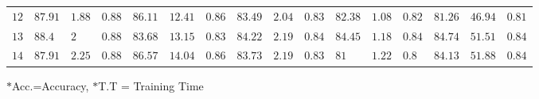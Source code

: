 \begin{table}
{\begin{tabular}{clllllllllllllll}
			$12$                               & $87.91$     & $1.88$      & $0.88$ & $86.11$      & $12.41$      & $0.86$ & $83.49$     & $2.04$      & $0.83$ & $82.38$     & $1.08$      & $0.82$ & $81.26$     & $46.94$     & $0.81$ \\
			$13$                               & $88.4$      & $2$         & $0.88$ & $83.68$      & $13.15$      & $0.83$ & $84.22$     & $2.19$      & $0.84$ & $\mathbf{84.45}$     & $\mathbf{1.18}$      & $\mathbf{0.84}$ & $\mathbf{84.74}$     & $\mathbf{51.51}$     & $\mathbf{0.84}$ \\
			$14$                               & $87.91$     & $2.25$      & $0.88$ & $86.57$      & $14.04$      & $0.86$ & $83.73$     & $2.19$      & $0.83$ & $81$        & $1.22$      & $0.8$  & $84.13$     & $51.88$     & $0.84$ \\
			\bottomrule[1.25pt]
	\end{tabular}}
	\vspace{0.5ex}
	\raggedright $\ast$Acc.=Accuracy, $\ast$T.T = Training Time
\end{table}


